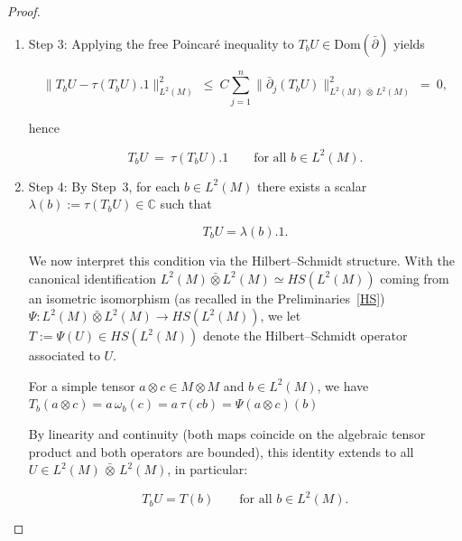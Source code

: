 \documentclass[10pt,a4paper,reqno]{amsart}
\newcommand{\C}{\mathbb{C}}
\newcommand{\Dom}{\mathrm{Dom}}
\begin{document}
\begin{proof}
\begin{enumerate}
\[
  T_b U_n \to T_b U,\qquad
  \partial_j(T_bU_n)=(\mathrm{id}\otimes\mathrm{id}\otimes \omega_b)\big((\partial_j\otimes \mathrm{id})U_n\big)\to (\mathrm{id}\otimes\mathrm{id}\otimes \omega_b)(W).
  \]



  Using closability of $\bar\partial_j$, we conclude
  

\[
  T_b U\in \Dom(\bar\partial_j),\qquad
  \bar\partial_j(T_b U)\ =\ (\mathrm{id}\otimes\mathrm{id}\otimes \omega_b)\big((\overline{\partial_j\otimes \mathrm{id}})U\big).
  \]



  In particular, if $(\overline{\partial_j\otimes \mathrm{id}})U=0$, then $\bar\partial_j(T_b U)=0$ for all $j$.

  \item Step 3: Applying the free Poincaré inequality to $T_b U\in \Dom(\bar\partial)$ yields
  

\[
  \|T_b U-\tau(T_b U).1\|_{L^2(M)}^2\ \le\ C \sum_{j=1}^n \|\bar\partial_j(T_b U)\|_{L^2(M)\,\bar\otimes\,L^2(M)}^2\ =\ 0,
  \]


  hence
  

\[
  T_b U\ =\ \tau(T_b U).1\qquad\text{for all }b\in L^2(M).
  \]



    \item Step 4:
  By Step~3, for each $b\in L^2(M)$ there exists a scalar $\lambda(b):=\tau(T_bU)\in\C$ such that
  

\[
    T_b U = \lambda(b).1.
  \]



  We now interpret this condition via the Hilbert--Schmidt structure.
  With the canonical identification
$L^2(M)\bar\otimes L^2(M) \simeq HS(L^2(M))$
coming from an isometric isomorphism (as recalled in the Preliminaries~\ref{HS})
   $ \Psi: L^2(M)\bar\otimes L^2(M) \rightarrow HS(L^2(M))$, we let $T:=\Psi(U)\in HS(L^2(M))$ denote the Hilbert--Schmidt operator associated to $U$.

  For a simple tensor $a\otimes c\in M\otimes M$ and $b\in L^2(M)$, we have $T_b(a\otimes c)
    = a\,\omega_b(c)
    = a\,\tau(cb)
    = \Psi(a\otimes c)(b)$
  


  By linearity and continuity (both maps coincide on the algebraic tensor product and both operators are bounded), this identity extends to all $U\in L^2(M)\,\bar\otimes\,L^2(M)$, in particular:
  

\[
    T_b U = T(b)\qquad\text{for all }b\in L^2(M).
  \]



\end{enumerate}
\end{proof}
\end{document}
